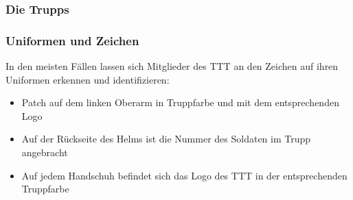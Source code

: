 \subsubsection{Die Trupps}
\subsubsection{Uniformen und Zeichen}
In den meisten Fällen lassen sich Mitglieder des \ac{TTT} an den Zeichen auf ihren Uniformen erkennen und identifizieren:
\begin{itemize}
	\item Patch auf dem linken Oberarm in Truppfarbe und mit dem entsprechenden Logo
	\item Auf der Rückseite des Helms ist die Nummer des Soldaten im Trupp angebracht
	\item Auf jedem Handschuh befindet sich das Logo des \ac{TTT} in der entsprechenden Truppfarbe
\end{itemize}

